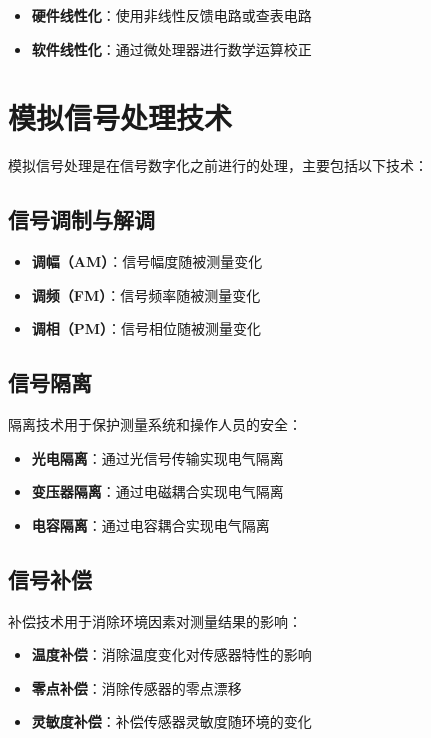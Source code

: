 \documentclass[12pt,UTF8]{ctexbook}
\begin{document}
\begin{itemize}[leftmargin=2cm]
	\item \textbf{硬件线性化}：使用非线性反馈电路或查表电路
	\item \textbf{软件线性化}：通过微处理器进行数学运算校正
\end{itemize}

\section{模拟信号处理技术}

模拟信号处理是在信号数字化之前进行的处理，主要包括以下技术：

\subsection{信号调制与解调}

\begin{itemize}[leftmargin=2cm]
	\item \textbf{调幅（AM）}：信号幅度随被测量变化
	\item \textbf{调频（FM）}：信号频率随被测量变化
	\item \textbf{调相（PM）}：信号相位随被测量变化
\end{itemize}

\subsection{信号隔离}

隔离技术用于保护测量系统和操作人员的安全：

\begin{itemize}[leftmargin=2cm]
	\item \textbf{光电隔离}：通过光信号传输实现电气隔离
	\item \textbf{变压器隔离}：通过电磁耦合实现电气隔离
	\item \textbf{电容隔离}：通过电容耦合实现电气隔离
\end{itemize}

\subsection{信号补偿}

补偿技术用于消除环境因素对测量结果的影响：

\begin{itemize}[leftmargin=2cm]
	\item \textbf{温度补偿}：消除温度变化对传感器特性的影响
	\item \textbf{零点补偿}：消除传感器的零点漂移
	\item \textbf{灵敏度补偿}：补偿传感器灵敏度随环境的变化
\end{itemize}
\end{document}
